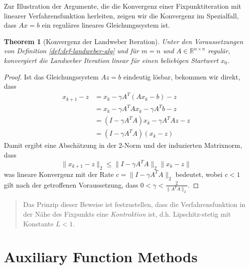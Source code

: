 \documentclass[
]{book}
\newenvironment {JHSAYS} [0] {\begin{quote}\color{jhsc}} {\end{quote}}
\newtheorem{theorem}{Theorem}[chapter]
\theoremstyle{definition}
\theoremstyle{definition}
\theoremstyle{definition}
\theoremstyle{definition}
\theoremstyle{remark}
\begin{document}
Zur Illustration der Argumente, die die Konvergenz einer Fixpunktiteration mit linearer Verfahrensfunktion herleiten, zeigen wir die Konvergenz im Spezialfall, dass \(Ax=b\) ein reguläres lineares Gleichungssystem ist.

\begin{theorem}[Konvergenz der Landweber Iteration]
\protect\hypertarget{thm:thm-lw-conv}{}\label{thm:thm-lw-conv}Unter den Voraussetzungen von Definition \ref{def:def-landweber-alg} und für \(m=n\) und \(A\in \mathbb R^{n\times n}\) regulär, konvergiert die Landweber Iteration linear für einen beliebigen Startwert \(x_0\).
\end{theorem}

\begin{proof}
Ist das Gleichungssystem \(Az=b\) eindeutig lösbar, bekommen wir direkt, dass
\begin{equation*}
\begin{split}
x_{k+1} - z &= x_k - \gamma A^T(Ax_k -b ) - z  \\
&= x_k - \gamma A^TAx_k -\gamma A^Tb - z \\
&= (I-\gamma A^TA)x_k -\gamma A^TAz - z \\
&= (I-\gamma A^TA)(x_k - z)
\end{split}
\end{equation*}
Damit ergibt eine Abschätzung in der \(2\)-Norm und der induzierten Matrixnorm, dass
\begin{equation*}
\|x_{k+1}-z\|_2 \leq \|I-\gamma A^TA\|_2\|x_k-z\|
\end{equation*}
was lineare Konvergenz mit der Rate \(c=\|I-\gamma A^TA\|_2\) bedeutet, wobei \(c<1\) gilt nach der getroffenen Voraussetzung, dass \(0<\gamma<\frac{2}{\|A^TA\|_2}\).
\end{proof}

\leavevmode\hypertarget{rem-fpconv-iteration-contraction}{}%
\begin{JHSAYS}
Das Prinzip dieser Beweise ist festzustellen, dass die Verfahrensfunktion in der Nähe des Fixpunkts eine \emph{Kontraktion} ist, d.h. Lipschitz-stetig mit Konstante \(L<1\).

\end{JHSAYS}

\hypertarget{auxiliary-function-methods}{%
\section{Auxiliary Function Methods}\label{auxiliary-function-methods}}
\end{document}
